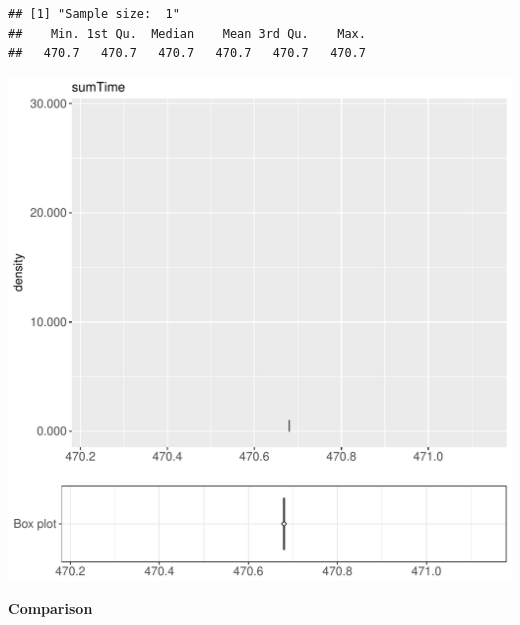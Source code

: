 \documentclass{article}\usepackage[]{graphicx}\usepackage[]{color}
\makeatletter
\def\maxwidth{ %
  \ifdim\Gin@nat@width>\linewidth
    \linewidth
  \else
    \Gin@nat@width
  \fi
}
\newenvironment{kframe}{%
 \def\at@end@of@kframe{}%
 \ifinner\ifhmode%
  \def\at@end@of@kframe{\end{minipage}}%
  \begin{minipage}{\columnwidth}%
 \fi\fi%
 \def\FrameCommand##1{\hskip\@totalleftmargin \hskip-\fboxsep
 \colorbox{shadecolor}{##1}\hskip-\fboxsep
     \hskip-\linewidth \hskip-\@totalleftmargin \hskip\columnwidth}%
 \MakeFramed {\advance\hsize-\width
   \@totalleftmargin\z@ \linewidth\hsize
   \@setminipage}}%
 {\par\unskip\endMakeFramed%
 \at@end@of@kframe}
\newenvironment{knitrout}{}{} %
\makeatother
\begin{document}
\begin{knitrout}
\color{fgcolor}\begin{kframe}
\begin{verbatim}
## [1] "Sample size:  1"
##    Min. 1st Qu.  Median    Mean 3rd Qu.    Max. 
##   470.7   470.7   470.7   470.7   470.7   470.7
\end{verbatim}


{\ttfamily\noindent\bfseries{}}\end{kframe}
\includegraphics[width=\maxwidth]{figure/RH1_nocache_password-1} 

\end{knitrout}
  
 \textbf{Comparison}
  
\end{document}

